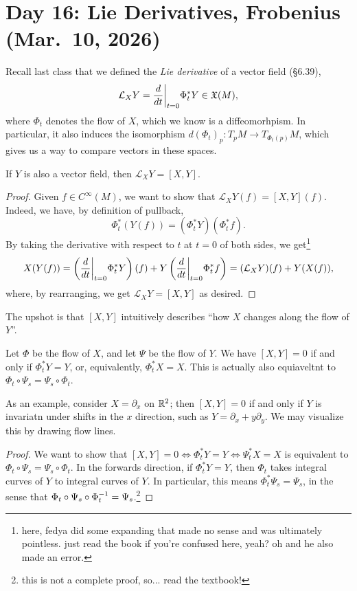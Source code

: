 \section{Day 16: Lie Derivatives, Frobenius (Mar.\ 10, 2026)}
Recall last class that we defined the \textit{Lie derivative} of a vector field (\S6.39),
\[ \mathcal{L}_X Y = \restr{\frac{d}{dt}}{t=0} \Phi_t^\ast Y \in \KX(M), \]
where $\Phi_t$ denotes the flow of $X$, which we know is a diffeomorhpism. In particular, it also induces the isomorphism $d(\Phi_t)_p \colon T_p M \to T_{\Phi_t(p)} M$, which gives us a way to compare vectors in these spaces.
\begin{theorem}[\S6.40]
    If $Y$ is also a vector field, then $\mathcal{L}_X Y = [X, Y]$.
\end{theorem}
\begin{proof}
    Given $f \in C^\infty(M)$, we want to show that $\mathcal{L}_X Y(f) = [X, Y](f)$. Indeed, we have, by definition of pullback,
    \[ \Phi_t^\ast (Y(f)) = (\Phi_t^\ast Y) (\Phi_t^\ast f). \]
    By taking the derivative with respect to $t$ at $t = 0$ of both sides, we get\footnote{here, fedya did some expanding that made no sense and was ultimately pointless. just read the book if you're confused here, yeah? oh and he also made an error.}
    \[ X(Y(f)) = \left(\restr{\frac{d}{dt}}{t=0} \Phi_t^\ast Y\right)(f) + Y \left(\restr{\frac{d}{dt}}{t=0} \Phi_t^\ast f\right) = (\mathcal{L}_X Y)(f) + Y(X(f)), \]
    where, by rearranging, we get $\mathcal{L}_X Y = [X, Y]$ as desired.
\end{proof}
The upshot is that $[X, Y]$ intuitively describes ``how $X$ changes along the flow of $Y$''.
\begin{theorem}[\S6.41]
    Let $\Phi$ be the flow of $X$, and let $\Psi$ be the flow of $Y$. We have $[X, Y] = 0$ if and only if $\Phi_t^\ast Y = Y$, or, equivalently, $\Phi_t^\ast X = X$. This is actually also equiaveltnt to $\Phi_t \circ \Psi_s = \Psi_s \circ \Phi_t$.
\end{theorem}
As an example, consider $X = \partial_x$ on $\mathbb R^2$; then $[X, Y] = 0$ if and only if $Y$ is invariatn under shifts in the $x$ direction, such as $Y = \partial_x + y \partial_y$. We may visualize this by drawing flow lines.
\begin{proof}
    We want to show that $[X, Y] = 0 \iff \Phi_t^\ast Y = Y \iff \Psi_t^\ast X = X$ is equivalent to $\Phi_t \circ \Psi_s = \Psi_s \circ \Phi_t$. In the forwards direction, if $\Phi_t^\ast Y = Y$, %
    then $\Phi_t$ takes integral curves of $Y$ to integral curves of $Y$. In particular, this means $\Phi_t^\ast \Psi_s = \Psi_s$, in the sense that $\Phi_t \circ \Psi_s \circ \Phi_t^{-1} = \Psi_s$.\footnote{this is not a complete proof, so... read the textbook!}
\end{proof}
